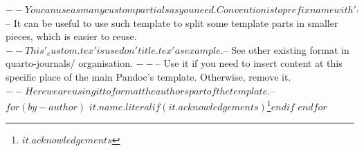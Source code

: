 $-- You can use as many custom partials as you need. Convention is to prefix name with '_'
$-- It can be useful to use such template to split some template parts in smaller pieces, which is easier to reuse. 
$-- This '_custom.tex' is used on 'title.tex' as example.
$-- See other existing format in quarto-journals/ organisation.
$-- %
$-- Use it if you need to insert content at this specific place of the main Pandoc's template. Otherwise, remove it.
$-- Here we are using it to format the authors part of the template.
$-- %
$for(by-author)$
$it.name.literal$$if(it.acknowledgements)$\thanks{$it.acknowledgements$}$endif$
$endfor$
